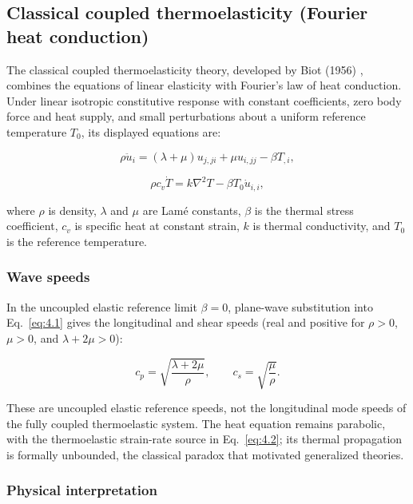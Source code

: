 \subsection{Classical coupled thermoelasticity (Fourier heat conduction)}
\label{sec:4.2}

The classical coupled thermoelasticity theory, developed by Biot (1956) \cite{Biot1956}, combines the equations of linear elasticity with Fourier's law of heat conduction. Under linear isotropic constitutive response with constant coefficients, zero body force and heat supply, and small perturbations about a uniform reference temperature $T_0$, its displayed equations are:

\begin{equation}
\rho\ddot{u}_i = (\lambda + \mu)u_{j,ji} + \mu u_{i,jj} - \beta T_{,i},
\label{eq:4.1}
\end{equation}

\begin{equation}
\rho c_v \dot{T} = k\nabla^2 T - \beta T_0 \dot{u}_{i,i},
\label{eq:4.2}
\end{equation}

where $\rho$ is density, $\lambda$ and $\mu$ are Lam\'e constants, $\beta$ is the thermal stress coefficient, $c_v$ is specific heat at constant strain, $k$ is thermal conductivity, and $T_0$ is the reference temperature.

\subsubsection{Wave speeds}

In the uncoupled elastic reference limit $\beta=0$, plane-wave substitution into Eq.~\eqref{eq:4.1} gives the longitudinal and shear speeds (real and positive for $\rho>0$, $\mu>0$, and $\lambda+2\mu>0$):

\begin{equation}
c_p = \sqrt{\frac{\lambda + 2\mu}{\rho}},
\qquad
c_s = \sqrt{\frac{\mu}{\rho}}.
\label{eq:4.3}
\end{equation}

These are uncoupled elastic reference speeds, not the longitudinal mode speeds of the fully coupled thermoelastic system. The heat equation remains parabolic, with the thermoelastic strain-rate source in Eq.~\eqref{eq:4.2}; its thermal propagation is formally unbounded, the classical paradox that motivated generalized theories.

\subsubsection{Physical interpretation}

